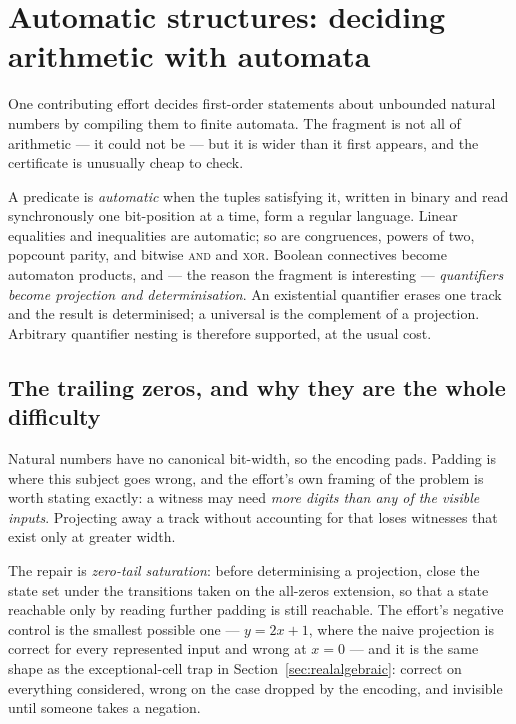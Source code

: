 \section{Automatic structures: deciding arithmetic with automata}
\label{sec:automatic}

One contributing effort decides first-order statements about unbounded natural
numbers by compiling them to finite automata. The fragment is not all of
arithmetic --- it could not be --- but it is wider than it first appears, and
the certificate is unusually cheap to check.

A predicate is \emph{automatic} when the tuples satisfying it, written in binary
and read synchronously one bit-position at a time, form a regular language.
Linear equalities and inequalities are automatic; so are congruences, powers of
two, popcount parity, and bitwise \textsc{and} and \textsc{xor}. Boolean
connectives become automaton products, and --- the reason the fragment is
interesting --- \emph{quantifiers become projection and determinisation}. An
existential quantifier erases one track and the result is determinised; a
universal is the complement of a projection. Arbitrary quantifier nesting is
therefore supported, at the usual cost.

\subsection{The trailing zeros, and why they are the whole difficulty}

Natural numbers have no canonical bit-width, so the encoding pads. Padding is
where this subject goes wrong, and the effort's own framing of the problem is
worth stating exactly: a witness may need \emph{more digits than any of the
visible inputs}. Projecting away a track without accounting for that loses
witnesses that exist only at greater width.

The repair is \emph{zero-tail saturation}: before determinising a projection,
close the state set under the transitions taken on the all-zeros extension, so
that a state reachable only by reading further padding is still reachable. The
effort's negative control is the smallest possible one --- $y=2x+1$, where the
naive projection is correct for every represented input and wrong at $x=0$ ---
and it is the same shape as the exceptional-cell trap in
Section~\ref{sec:realalgebraic}: correct on everything considered, wrong on the
case dropped by the encoding, and invisible until someone takes a negation.

